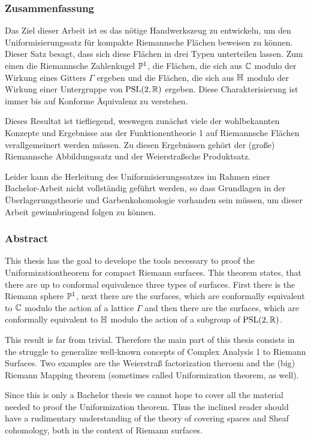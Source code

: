 
\subsubsection*{Zusammenfassung}
\label{sec:Zusammenfassung}

Das Ziel dieser Arbeit ist es das nötige Handwerkszeug zu
entwickeln, um den Uniformisierungssatz für kompakte Riemannsche
Flächen beweisen zu können. Dieser Satz besagt, dass sich diese
Flächen in drei Typen unterteilen lassen. Zum einen die Riemannsche
Zahlenkugel $\P^1$, die Flächen, die sich aus $\C$ modulo der
Wirkung eines Gitters $\Gamma$ ergeben und die Flächen, die sich aus
$\h$ modulo der Wirkung einer Untergruppe von $\PSL(2, \R)$
ergeben. Diese Charakterisierung ist immer bis auf Konforme
Äquivalenz zu verstehen.

Dieses Resultat ist tiefliegend, weswegen zunächst viele der
wohlbekannten Konzepte und Ergebnisse aus der Funktionentheorie 1 auf
Riemannsche Flächen verallgemeinert werden müssen. Zu diesen
Ergebnissen gehört der (große) Riemannsche Abbildungssatz und der
Weierstraßsche Produktsatz.

Leider kann die Herleitung des Uniformisierungssatzes im Rahmen
einer Bachelor-Arbeit nicht vollständig geführt werden, so dass
Grundlagen in der Überlagerungstheorie und Garbenkohomologie
vorhanden sein müssen, um dieser Arbeit gewinnbringend folgen zu können.

\subsubsection*{Abstract}
\label{sec:abstract}

This thesis has the goal to develope the tools necessary to proof the
Uniformizationtheorem for compact Riemann surfaces. This theorem
states, that there are up to conformal equivalence three types of
surfaces. First there is the Riemann sphere $\P^1$, next there are the
surfaces, which are conformally equivalent to $\C$ modulo the action
af a lattice $\Gamma$ and then there are the surfaces, which are
conformally equivalent to $\h$ modulo the action of a subgroup of
$\PSL(2, \R)$.

This result is far from trivial. Therefore the main part of this
thesis consists in the struggle to generalize well-known concepts of
Complex Analysis 1 to Riemann Surfaces. Two examples are the
Weierstraß factorization theroem and the (big) Riemann Mapping theorem
(sometimes called Uniformization theorem, as well).

Since this is only a Bachelor thesis we cannot hope to cover all the
material needed to proof the Uniformization theorem. Thus the inclined
reader should have a rudimentary understanding of the theory of
covering spaces and Sheaf cohomology, both in the context of Riemann surfaces.

